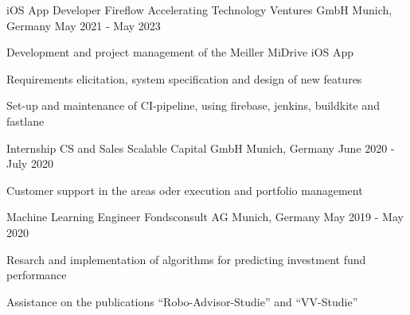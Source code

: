 


\begin{cventries}


\cventry
{iOS App Developer} %
{Fireflow Accelerating Technology Ventures GmbH} %
{Munich, Germany} %
{May 2021 - May 2023} %
{ %
\begin{cvitems}
\item {Development and project management of the Meiller MiDrive iOS App}
\item {Requirements elicitation, system specification and design of new features}
\item {Set-up and maintenance of CI-pipeline, using firebase, jenkins, buildkite and fastlane}
\end{cvitems}
}


\cventry
{Internship CS and Sales} %
{Scalable Capital GmbH} %
{Munich, Germany} %
{June 2020 - July 2020} %
{ %
\begin{cvitems}
\item {Customer support in the areas oder execution and portfolio management}
\end{cvitems}
}


\cventry
{Machine Learning Engineer} %
{Fondsconsult AG} %
{Munich, Germany} %
{May 2019 - May 2020} %
{ %
\begin{cvitems}
\item {Resarch and implementation of algorithms for predicting  investment fund performance}
\item {Assistance on the publications ``Robo-Advisor-Studie'' and ``VV-Studie''}
\end{cvitems}
}


\end{cventries}

